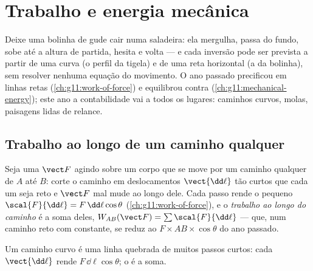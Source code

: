 \chapter{Trabalho e energia mecânica}\label{ch:g12:work-and-energy}

Deixe uma bolinha de gude cair numa saladeira: ela mergulha, passa do fundo, sobe até a
altura de partida, hesita e volta --- e cada inversão pode ser prevista a partir de uma
curva (o perfil da tigela) e de uma reta horizontal (a  da bolinha), sem
resolver nenhuma equação do movimento. O ano passado precificou  em linhas retas
(\cref{ch:g11:work-of-force}) e equilibrou  contra 
(\cref{ch:g11:mechanical-energy}); este ano a contabilidade vai a todos os lugares:
caminhos curvos, molas, paisagens lidas de relance.

\section{Trabalho ao longo de um caminho qualquer}

\begin{definition}\label{def:g12:work-and-energy:path}
Seja uma  $\vect F$ agindo sobre um corpo que se move por um caminho qualquer de
$A$ até $B$: corte o caminho em deslocamentos $\vect{\dd\ell}$ tão curtos que cada um
seja reto e $\vect F$ mal mude ao longo dele. Cada passo rende o pequeno 
$\scal{F}{\dd\ell} = F\,\dd\ell\cos\theta$ (\cref{ch:g11:work-of-force}), e o
\emph{trabalho ao longo do caminho} é a soma deles, $W_{AB}(\vect F) = \sum \scal{F}{\dd\ell}$ --- que, num
caminho reto com  constante, se reduz ao $F \times AB \times \cos\theta$ do ano
passado.
\end{definition}

\begin{omfigure}

{\small Um caminho curvo é uma linha quebrada de muitos passos curtos: cada
$\vect{\dd\ell}$ rende $F\,\dd\ell\cos\theta$; o  é a soma.}
\end{omfigure}

